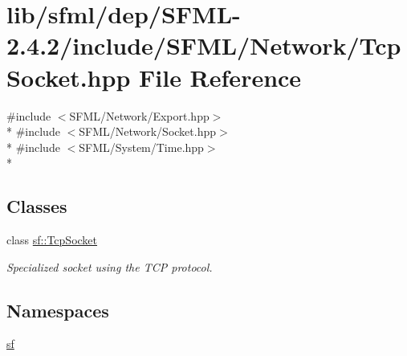 \hypertarget{sfml_2dep_2_s_f_m_l-2_84_82_2include_2_s_f_m_l_2_network_2_tcp_socket_8hpp}{\section{lib/sfml/dep/\-S\-F\-M\-L-\/2.4.2/include/\-S\-F\-M\-L/\-Network/\-Tcp\-Socket.hpp File Reference}
\label{sfml_2dep_2_s_f_m_l-2_84_82_2include_2_s_f_m_l_2_network_2_tcp_socket_8hpp}
}
{\ttfamily \#include $<$S\-F\-M\-L/\-Network/\-Export.\-hpp$>$}\\*
{\ttfamily \#include $<$S\-F\-M\-L/\-Network/\-Socket.\-hpp$>$}\\*
{\ttfamily \#include $<$S\-F\-M\-L/\-System/\-Time.\-hpp$>$}\\*
\subsection*{Classes}
\begin{DoxyCompactItemize}
\item 
class \hyperlink{classsf_1_1_tcp_socket}{sf\-::\-Tcp\-Socket}
\begin{DoxyCompactList}\small\item\em Specialized socket using the T\-C\-P protocol. \end{DoxyCompactList}\end{DoxyCompactItemize}
\subsection*{Namespaces}
\begin{DoxyCompactItemize}
\item 
\hyperlink{namespacesf}{sf}
\end{DoxyCompactItemize}
